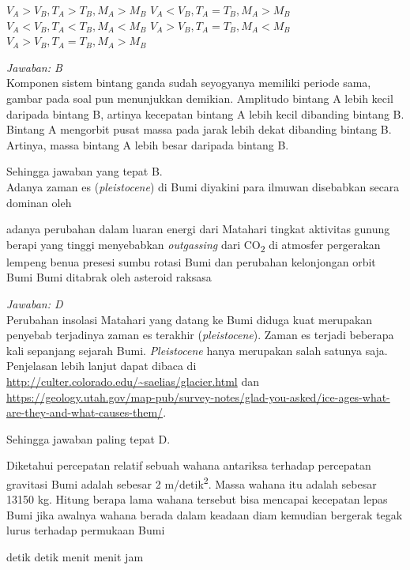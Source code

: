 \documentclass[11pt,fleqn]{exam}
\begin{document}
\begin{questions}
\begin{choices}
\choice $V_A > V_B, T_A > T_B, M_A > M_B$
\choice $V_A < V_B, T_A = T_B, M_A > M_B$
\choice $V_A < V_B, T_A < T_B, M_A < M_B$
\choice $V_A > V_B, T_A = T_B, M_A < M_B$
\choice $V_A > V_B, T_A = T_B, M_A > M_B$
\end{choices}

\textit{Jawaban: B} \\
Komponen sistem bintang ganda sudah seyogyanya memiliki periode sama, gambar pada soal pun menunjukkan demikian. Amplitudo bintang A lebih kecil daripada bintang B, artinya kecepatan bintang A lebih kecil dibanding bintang B. Bintang A mengorbit pusat massa pada jarak lebih dekat dibanding bintang B. Artinya, massa bintang A lebih besar daripada bintang B.

Sehingga jawaban yang tepat B.\\


\vspace{0.3cm}
\question Adanya zaman es (\textit{pleistocene}) di Bumi diyakini para ilmuwan disebabkan secara dominan oleh
\begin{choices}
\choice adanya perubahan dalam luaran energi dari Matahari
\choice tingkat aktivitas gunung berapi yang tinggi menyebabkan \textit{outgassing} dari CO\textsubscript{2} di atmosfer
\choice pergerakan lempeng benua
\choice presesi sumbu rotasi Bumi dan perubahan kelonjongan orbit Bumi
\choice Bumi ditabrak oleh asteroid raksasa
\end{choices}

\textit{Jawaban: D} \\
Perubahan insolasi Matahari yang datang ke Bumi diduga kuat merupakan penyebab terjadinya zaman es terakhir (\textit{pleistocene}). Zaman es terjadi beberapa kali sepanjang sejarah Bumi. \textit{Pleistocene} hanya merupakan salah satunya saja. Penjelasan lebih lanjut dapat dibaca di \url{http://culter.colorado.edu/~saelias/glacier.html} dan \url{https://geology.utah.gov/map-pub/survey-notes/glad-you-asked/ice-ages-what-are-they-and-what-causes-them/}.

Sehingga jawaban paling tepat D.


\vspace{0.3cm}
\question Diketahui percepatan relatif sebuah wahana antariksa terhadap percepatan gravitasi Bumi adalah sebesar 2 m/detik\textsuperscript{2}. Massa wahana itu adalah sebesar 13150 kg. Hitung berapa lama wahana tersebut bisa mencapai kecepatan lepas Bumi jika awalnya wahana berada dalam keadaan diam kemudian bergerak tegak lurus terhadap permukaan Bumi
\begin{choices}
 detik
 detik
 menit
 menit
 jam
\end{choices}


\end{questions}
\end{document}
